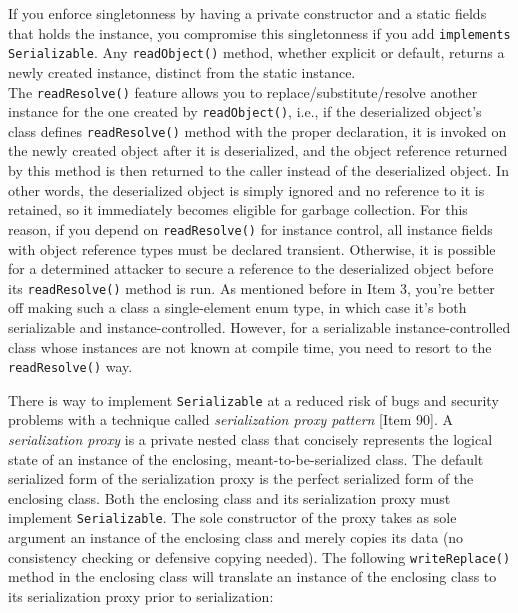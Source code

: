 \documentclass[table, xcdraw]{article}%
\begin{document}
If you enforce singletonness by having a private constructor and a static fields that holds the instance, you compromise this singletonness if you add \texttt{implements Serializable}. Any \texttt{readObject()} method, whether explicit or default, returns a newly created instance, distinct from the static instance.\\
The \texttt{readResolve()} feature allows you to replace/substitute/resolve another instance for the one created by \texttt{readObject()}, i.e., if the deserialized object's class defines \texttt{readResolve()} method with the proper declaration, it is invoked on the newly created object after it is deserialized, and the object reference returned by this method is then returned to the caller instead of the deserialized object. In other words, the deserialized object is simply ignored and no reference to it is retained, so it immediately becomes eligible for garbage collection. For this reason, if you depend on \texttt{readResolve()} for instance control, all instance fields with object reference types must be declared transient. Otherwise, it is possible for a determined attacker to secure a reference to the deserialized object before its \texttt{readResolve()} method is run. As mentioned before in Item 3, you're better off making such a class a single-element enum type, in which case it's both serializable and instance-controlled. However, for a serializable instance-controlled class whose instances are not known at compile time, you need to resort to the \texttt{readResolve()} way.

There is way to implement \texttt{Serializable} at a reduced risk of bugs and security problems with a technique called \emph{serialization proxy pattern} [Item 90]. A \emph{serialization proxy} is a private nested class that concisely represents the logical state of an instance of the enclosing, meant-to-be-serialized class. The default serialized form of the serialization proxy is the perfect serialized form of the enclosing class. Both the enclosing class and its serialization proxy must implement \texttt{Serializable}. The sole constructor of the proxy takes as sole argument an instance of the enclosing class and merely copies its data (no consistency checking or defensive copying needed). The following \texttt{writeReplace()} method in the enclosing class will translate an instance of the enclosing class to its serialization proxy prior to serialization:
\end{document}
